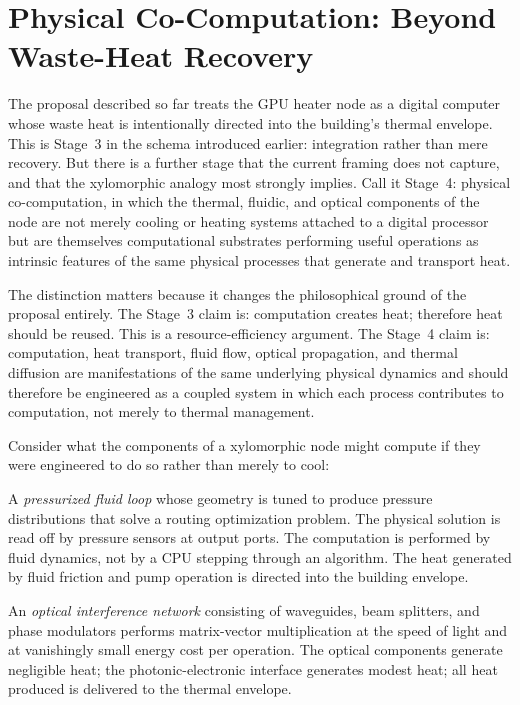 \documentclass[12pt, oneside]{article}
\begin{document}
\section{Physical Co-Computation: Beyond Waste-Heat Recovery}

The proposal described so far treats the GPU heater node as a digital computer whose waste heat is intentionally directed into the building's thermal envelope. This is Stage~3 in the schema introduced earlier: integration rather than mere recovery. But there is a further stage that the current framing does not capture, and that the xylomorphic analogy most strongly implies. Call it Stage~4: physical co-computation, in which the thermal, fluidic, and optical components of the node are not merely cooling or heating systems attached to a digital processor but are themselves computational substrates performing useful operations as intrinsic features of the same physical processes that generate and transport heat.

The distinction matters because it changes the philosophical ground of the proposal entirely. The Stage~3 claim is: computation creates heat; therefore heat should be reused. This is a resource-efficiency argument. The Stage~4 claim is: computation, heat transport, fluid flow, optical propagation, and thermal diffusion are manifestations of the same underlying physical dynamics and should therefore be engineered as a coupled system in which each process contributes to computation, not merely to thermal management.

Consider what the components of a xylomorphic node might compute if they were engineered to do so rather than merely to cool:

A \emph{pressurized fluid loop} whose geometry is tuned to produce pressure distributions that solve a routing optimization problem. The physical solution is read off by pressure sensors at output ports. The computation is performed by fluid dynamics, not by a CPU stepping through an algorithm. The heat generated by fluid friction and pump operation is directed into the building envelope.

An \emph{optical interference network} consisting of waveguides, beam splitters, and phase modulators performs matrix-vector multiplication at the speed of light and at vanishingly small energy cost per operation. The optical components generate negligible heat; the photonic-electronic interface generates modest heat; all heat produced is delivered to the thermal envelope.
\end{document}
